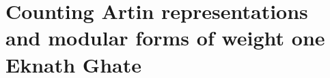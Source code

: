\chapter{Counting Artin representations and modular forms of weight one \\ Eknath Ghate}\label{ch:21}